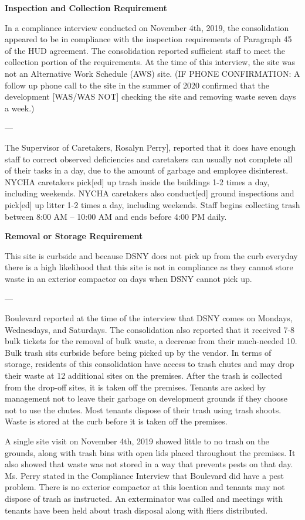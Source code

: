 
\textbf{Inspection and Collection Requirement}

In a compliance interview conducted on November 4th, 2019, the consolidation appeared to be in compliance with the inspection requirements of Paragraph 45 of the HUD agreement. The consolidation reported sufficient staff to meet the collection portion of the requirements. At the time of this interview, the site was not an Alternative Work Schedule (AWS) site. (IF PHONE CONFIRMATION: A follow up phone call to the site in the summer of 2020 confirmed that the development [WAS/WAS NOT] checking the site and removing waste seven days a week.)

---

The Supervisor of Caretakers, Rosalyn Perry], reported that it does have enough staff to correct observed deficiencies and caretakers can usually not complete all of their tasks in a day, due to the amount of garbage and employee disinterest. NYCHA caretakers pick[ed] up trash inside the buildings 1-2 times a day, including weekends. NYCHA caretakers also conduct[ed] ground inspections and pick[ed] up litter 1-2 times a day, including weekends. Staff begins collecting trash between 8:00 AM -- 10:00 AM and ends before 4:00 PM daily.

\textbf{Removal or Storage Requirement}

This site is curbside and because DSNY does not pick up from the curb everyday there is a high likelihood that this site is not in compliance as they cannot store waste in an exterior compactor on days when DSNY cannot pick up.

---

Boulevard reported at the time of the interview that DSNY comes on Mondays, Wednesdays, and Saturdays. The consolidation also reported that it received 7-8 bulk tickets for the removal of bulk waste, a decrease from their much-needed 10. Bulk trash sits curbside before being picked up by the vendor. In terms of storage, residents of this consolidation have access to trash chutes and may drop their waste at 12 additional sites on the premises. After the trash is collected from the drop-off sites, it is taken off the premises. Tenants are asked by management not to leave their garbage on development grounds if they choose not to use the chutes. Most tenants dispose of their trash using trash shoots. Waste is stored at the curb before it is taken off the premises. 

A single site visit on November 4th, 2019 showed little to no trash on the grounds, along with trash bins with open lids placed throughout the premises. It also showed that waste was not stored in a way that prevents pests on that day. Ms. Perry stated in the Compliance Interview that Boulevard did have a pest problem. There is no exterior compactor at this location and tenants may not dispose of trash as instructed. An exterminator was called and meetings with tenants have been held about trash disposal along with fliers distributed.

